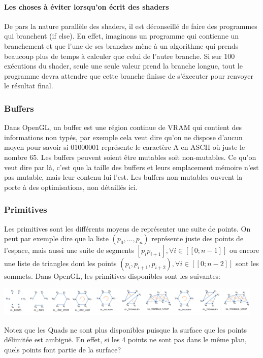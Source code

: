 \documentclass[a4paper,10pt]{article}
\begin{document}
\paragraph{Les choses à éviter lorsqu'on écrit des shaders} De pars la nature parallèle des shaders, il est déconseillé de faire des programmes qui branchent (if else). En effet, imaginons un programme qui contienne un branchement et que l'une de ses branches mène à un algorithme qui prends beaucoup plus de temps à calculer que celui de l'autre branche. Si sur 100 exécutions du shader, seule une seule valeur prend la branche longue, tout le programme devra attendre que cette branche finisse de s'éxecuter pour renvoyer le résultat final.

\subsubsection{Buffers}
Dans OpenGL, un buffer est une région continue de VRAM qui contient des informations non typés, par exemple cela veut dire qu'on ne dispose d'aucun moyen pour savoir si 01000001 représente le caractère A en ASCII où juste le nombre 65.
Les buffers peuvent soient être mutables soit non-mutables. Ce qu'on veut dire par là, c'est que la taille des buffers et leurs emplacement mémoire n'est pas mutable, mais leur contenu lui l'est. Les buffers non-mutables ouvrent la porte à des optimisations, non détaillés ici.

\newpage
\subsubsection{Primitives}
\label{subsubsec:Primitives}
Les primitives sont les différents moyens de représenter une suite de points. On peut par exemple dire que la liste $(p_0, ..., p_n)$ représente juste des points de l'espace, mais aussi une suite de segments $[p_ip_{i+1}], \forall i \in  [\![0;n-1]\!]$ ou encore une liste de triangles dont les points $(p_i, p_{i+1}, p_{i+2}), \forall i \in  [\![0;n-2]\!]$ sont les sommets. Dans OpenGL, les primitives disponibles sont les suivantes:

\includegraphics[width=0.96\textwidth]{OpenGL_primitives_flattened}

Notez que les Quads ne sont plus disponibles puisque la surface que les points délimitée est ambiguë. En effet, si les 4 points ne sont pas dans le même plan, quels points font partie de la surface?
\end{document}
